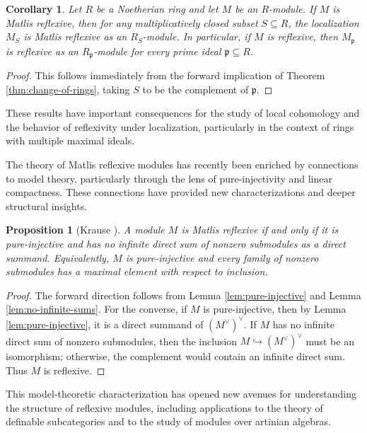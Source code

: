 \documentclass{kms-c}
\theoremstyle{plain}
\newtheorem{proposition}[theorem]{Proposition}
\newtheorem{corollary}[theorem]{Corollary}
\theoremstyle{definition}
\theoremstyle{remark}
\begin{document}
\begin{corollary}
\label{cor:localization}
Let \( R \) be a Noetherian ring and let \( M \) be an \( R \)-module. If \( M \) is Matlis reflexive, then for any multiplicatively closed subset \( S \subseteq R \), the localization \( M_S \) is Matlis reflexive as an \( R_S \)-module. In particular, if \( M \) is reflexive, then \( M_{\mathfrak{p}} \) is reflexive as an \( R_{\mathfrak{p}} \)-module for every prime ideal \( \mathfrak{p} \subseteq R \).
\end{corollary}
\begin{proof}
This follows immediately from the forward implication of Theorem \ref{thm:change-of-rings}, taking \( S \) to be the complement of \( \mathfrak{p} \). 
\end{proof}

These results have important consequences for the study of local cohomology and the behavior of reflexivity under localization, particularly in the context of rings with multiple maximal ideals.

The theory of Matlis reflexive modules has recently been enriched by connections to model theory, particularly through the lens of pure-injectivity and linear compactness. These connections have provided new characterizations and deeper structural insights.

\begin{proposition}[Krause \cite{Krause2025}]
\label{prop:model-theoretic}
A module \( M \) is Matlis reflexive if and only if it is pure-injective and has no infinite direct sum of nonzero submodules as a direct summand. Equivalently, \( M \) is pure-injective and every family of nonzero submodules has a maximal element with respect to inclusion.
\end{proposition}
\begin{proof}
The forward direction follows from Lemma \ref{lem:pure-injective} and Lemma \ref{lem:no-infinite-sums}. For the converse, if \( M \) is pure-injective, then by Lemma \ref{lem:pure-injective}, it is a direct summand of \( (M^\vee)^\vee \). If \( M \) has no infinite direct sum of nonzero submodules, then the inclusion \( M \hookrightarrow (M^\vee)^\vee \) must be an isomorphism; otherwise, the complement would contain an infinite direct sum. Thus \( M \) is reflexive. 
\end{proof}

This model-theoretic characterization has opened new avenues for understanding the structure of reflexive modules, including applications to the theory of definable subcategories and to the study of modules over artinian algebras.
\end{document}
